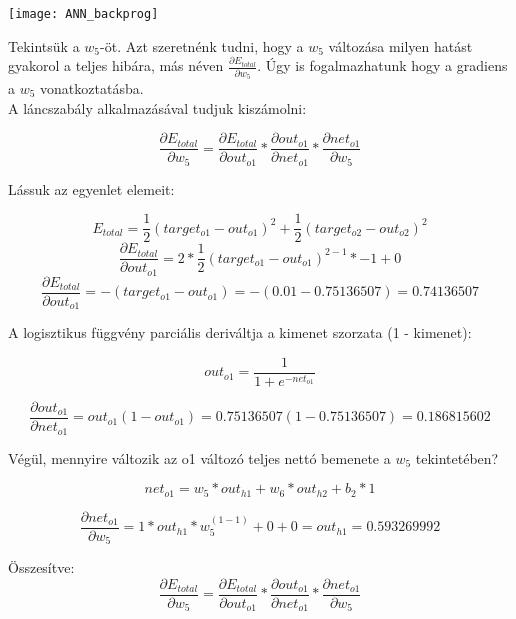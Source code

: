 \begin{center}
\texttt{[image: ANN\_backprog]}
\end{center}

Tekintsük a \(w_5\)-öt. Azt szeretnénk tudni, hogy a \(w_5\) változása milyen hatást gyakorol a teljes hibára, más néven $\frac{\partial E_ {total}}{\partial w_ {5}}$. Úgy is fogalmazhatunk hogy a gradiens a \(w_5\) vonatkoztatásba.\\

A láncszabály alkalmazásával tudjuk kiszámolni:

\[\frac{\partial E_{total}}{\partial w_{5}} = \frac{\partial E_{total}}{\partial out_{o1}} * \frac{\partial out_{o1}}{\partial net_{o1}} * \frac{\partial net_{o1}}{\partial w_{5}}\]

Lássuk az egyenlet elemeit:\\
\begin{flushleft}
\begin{equation}
E_{total} = \frac{1}{2}(target_{o1} - out_{o1})^{2} + \frac{1}{2}(target_{o2} - out_{o2})^{2}
\end{equation}
\begin{equation}
\frac{\partial E_{total}}{\partial out_{o1}} = 2 * \frac{1}{2}(target_{o1} - out_{o1})^{2 - 1} * -1 + 0
\end{equation}
\begin{equation}
\frac{\partial E_{total}}{\partial out_{o1}} = -(target_{o1} - out_{o1}) = -(0.01 - 0.75136507) = 0.74136507
\end{equation}

\end{flushleft}

A logisztikus függvény parciális deriváltja a kimenet szorzata (1 - kimenet):

\[out_{o1} = \frac{1}{1+e^{-net_{o1}}}\]

\[\frac{\partial out_{o1}}{\partial net_{o1}} = out_{o1}(1 - out_{o1}) = 0.75136507(1 - 0.75136507) = 0.186815602\]

Végül, mennyire változik az o1 változó teljes nettó bemenete a \(w_5\) tekintetében?

\[net_{o1} = w_5 * out_{h1} + w_6 * out_{h2} + b_2 * 1\]

\[\frac{\partial net_{o1}}{\partial w_{5}} = 1 * out_{h1} * w_5^{(1 - 1)} + 0 + 0 = out_{h1} = 0.593269992\]

Összesítve:\\

\[\frac{\partial E_{total}}{\partial w_{5}} = \frac{\partial E_{total}}{\partial out_{o1}} * \frac{\partial out_{o1}}{\partial net_{o1}} * \frac{\partial net_{o1}}{\partial w_{5}}\]

